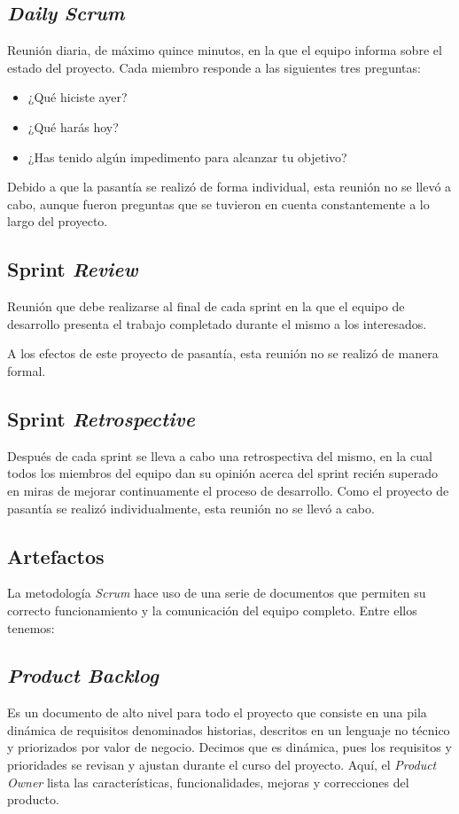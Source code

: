 \subsection{\emph{Daily} \emph{Scrum}}
Reunión diaria, de máximo quince minutos, en la que el equipo informa sobre el estado del proyecto. Cada miembro responde a las siguientes tres preguntas:

\begin{itemize}
	\item 	¿Qué hiciste ayer?
	\item 	¿Qué harás hoy?
	\item 	¿Has tenido algún impedimento para alcanzar tu objetivo?
\end{itemize}

Debido a que la pasantía se realizó de forma individual, esta reunión no se llevó a cabo, aunque fueron preguntas que se tuvieron en cuenta constantemente a lo largo del proyecto.

\subsection{Sprint \emph{Review}}
Reunión que debe realizarse al final de cada sprint en la que el equipo de desarrollo presenta el trabajo completado durante el mismo a los interesados.

A los efectos de este proyecto de pasantía, esta reunión no se realizó de manera formal.

\subsection{Sprint \emph{Retrospective}}
Después de cada sprint se lleva a cabo una retrospectiva del mismo, en la cual todos los miembros del equipo dan su opinión acerca del sprint recién superado en miras de mejorar continuamente el proceso de desarrollo. Como el proyecto de pasantía se realizó individualmente, esta reunión no se llevó a cabo.

\subsection{Artefactos}
La metodología \emph{Scrum} hace uso de una serie de documentos que permiten su correcto funcionamiento y la comunicación del equipo completo. Entre ellos tenemos:

\subsection{\emph{Product Backlog}}
Es un documento de alto nivel para todo el proyecto que consiste en una pila dinámica de requisitos denominados historias, descritos en un lenguaje no técnico y priorizados por valor de negocio. Decimos que es dinámica, pues los requisitos y prioridades se revisan y ajustan durante el curso del proyecto. Aquí, el \emph{Product Owner} lista las características, funcionalidades, mejoras y correcciones del producto.

